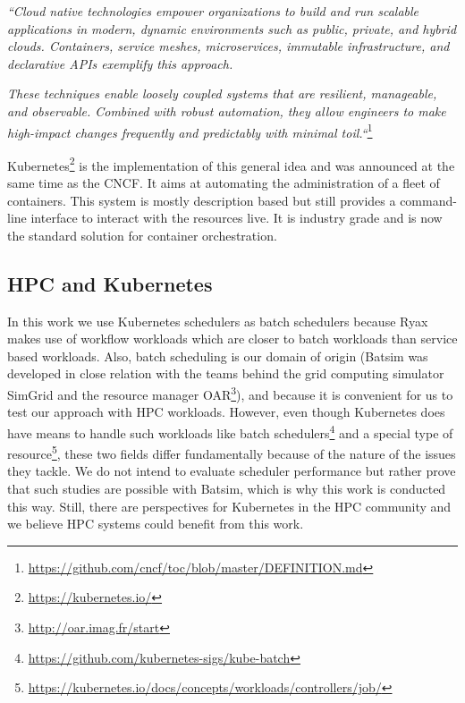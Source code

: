 \textit{``Cloud native technologies empower organizations to build and run
	scalable applications in modern, dynamic environments such as public,
	private, and hybrid clouds. Containers, service meshes, microservices,
	immutable infrastructure, and declarative APIs exemplify this
	approach.}

\textit{These techniques enable loosely coupled systems that
	are resilient, manageable, and observable.  Combined with robust
	automation, they allow engineers to make high-impact changes frequently
	and predictably with minimal toil.``}\footnote{\url{https://github.com/cncf/toc/blob/master/DEFINITION.md}}

Kubernetes\footnote{\url{https://kubernetes.io/}} is the implementation of this
general idea and was announced at the same time as the CNCF. It aims at
automating the administration of a fleet of containers. This system is mostly
description based but still provides a command-line interface to interact with
the resources live. It is industry grade and is now the standard solution for
container orchestration.

\subsection{HPC and Kubernetes}

In this work we use Kubernetes schedulers as batch schedulers because Ryax
makes use of workflow workloads which are closer to batch workloads than
service based workloads. Also, batch scheduling is our domain of origin (Batsim
	was developed in close relation with the teams behind the grid
computing simulator SimGrid \cite{casanova:hal-01017319} and the resource
manager OAR\footnote{\url{http://oar.imag.fr/start}}), and because it is convenient for us to test our
approach with HPC workloads.  However, even though Kubernetes does have means
to handle such workloads like batch
schedulers\footnote{\url{https://github.com/kubernetes-sigs/kube-batch}} and a
special type of
resource\footnote{\url{https://kubernetes.io/docs/concepts/workloads/controllers/job/}},
these two fields differ fundamentally because of the nature of the issues they
tackle. We do not intend to evaluate scheduler performance but rather prove
that such studies are possible with Batsim, which is why this work is conducted
this way. Still, there are perspectives for Kubernetes in the HPC community and
we believe HPC systems could benefit from this work.

